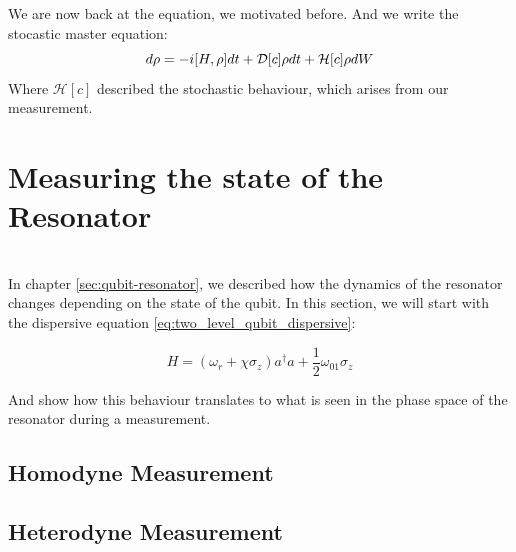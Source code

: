 We are now back at the equation, we motivated before. And we write the stocastic master equation:
\begin{equation}
    d\rho = -i \comm{H}{\rho}dt + \mathcal{D}[c]\rho dt + \mathcal{H}[c] \rho dW
\end{equation}
Where $\mathcal{H}[c]$ described the stochastic behaviour, which arises from our measurement.

\section{Measuring the state of the Resonator}
 \\ \noindent
In chapter \ref{sec:qubit-resonator}, we described how the dynamics of the resonator changes depending on the state of the qubit. In this section, we will start with the dispersive equation \ref{eq:two_level_qubit_dispersive}:

\begin{equation}\label{eq:two_level_qubit_dispersive_2}
    H = (\omega_r + \chi \sigma_z) a^\dagger a + \frac12 \omega_{01} \sigma_z
\end{equation}

And show how this behaviour translates to what is seen in the phase space of the resonator during a measurement.


\subsection{Homodyne Measurement}


\subsection{Heterodyne Measurement}
